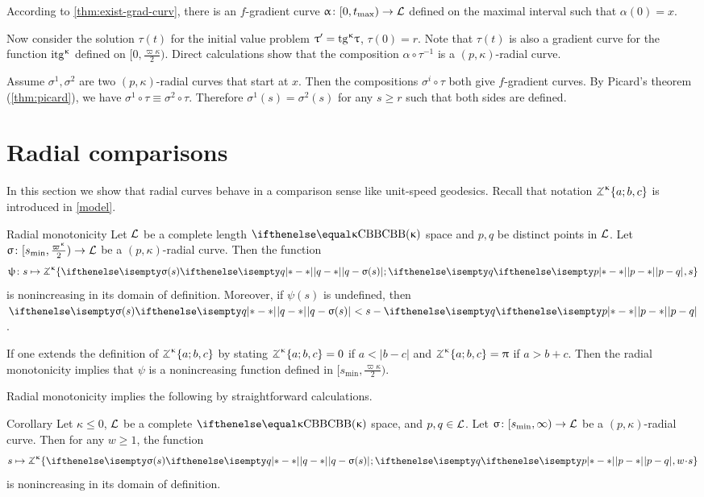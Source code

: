 According to \ref{thm:exist-grad-curv}, there is an $f$-gradient curve $\alpha\:[0,t_{\max})\to \spc{L}$ defined on the maximal interval such that $\alpha(0)=x$.

Now consider the solution $\tau(t)$ for the initial value problem $\tau'\z=\tang\kappa\tau$, $\tau(0)=r$. 
Note that $\tau(t)$ is also a gradient curve  for the function $\mathrm{itg}^{\upkappa}$ defined on $[0,\tfrac{\varpi\kappa}2)$.
Direct calculations show that the composition $\alpha\circ\tau^{-1}$ 
is a $(p,\kappa)$-radial curve.

 Assume $\sigma^1,\sigma^2$ are two $(p,\kappa)$-radial curves that start at $x$.
Then the compositions $\sigma^i\circ\tau$ both give $f$-gradient curves.
By Picard's theorem (\ref{thm:picard}), we have
$\sigma^1\circ\tau 
\equiv 
\sigma^2\circ\tau$.
Therefore $\sigma^1(s)=\sigma^2(s)$ 
for any $s\ge r$ such that both sides are defined.
\qeds

\section{Radial comparisons}\label{sec:Radial comparisons}

In this section we show that radial curves behave in a comparison sense like unit-speed geodesics.
Recall that notation $\tangle\mc\kappa\{a;b,c\}$ is introduced in \ref{model}.

\begin{thm}{Radial monotonicity}\label{rad-mon}
Let $\mathcal{L}$ be a complete length $\Alex{\kappa}$ space and
$p, q$ be distinct points in $\mathcal{L}$.
Let $\sigma\:  [s_{\min},\tfrac{\varpi\kappa}2)\to \spc{L}$
be a $(p,\kappa)$-radial curve.
Then the function 
\[\psi\:s\mapsto 
\tangle\mc\kappa\{
\dist{q}{\sigma(s)}{};
\dist{p}{q}{},
s
\}\]
is nonincreasing in its domain of definition.
Moreover, if $\psi(s)$ is undefined, then $\dist{q}{\sigma(s)}{}<s-\dist{p}{q}{}$.
\end{thm}

If one extends the definition of $\tangle\mc\kappa\{a;b,c\}$ by stating $\tangle\mc\kappa\{a;b,c\}\z=0$ if $a<|b-c|$ and $\tangle\mc\kappa\{a;b,c\}=\pi$ if $a>b+c$.
Then the radial monotonicity implies that $\psi$ is a nonincreasing function defined in $[s_{\min},\tfrac{\varpi\kappa}2)$.

Radial monotonicity implies the following by straightforward calculations.

\begin{thm}{Corollary}\label{cor:rad-comp}
Let $\kappa\le0$,
$\mathcal{L}$ be a complete $\Alex\kappa$ space,
and $p, q\in \spc{L}$.
Let $\sigma\:[s_{\min},\infty)\to \spc{L}$ be a $(p,\kappa)$-radial curve.
Then for any $w\ge 1$, 
the function
\[
s\mapsto \tangle\mc\kappa\{\dist{q}{\sigma(s)}{};\dist{p}{q}{},w\cdot s\}
\]
is nonincreasing in its domain of definition.
\end{thm}



